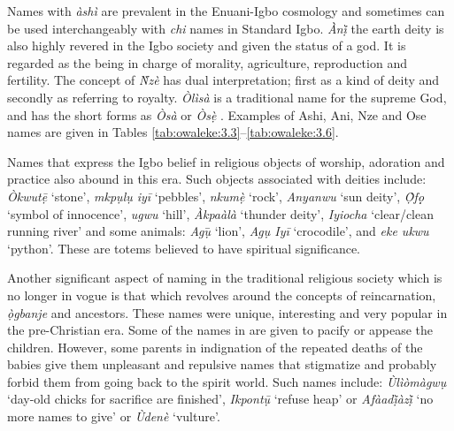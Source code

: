 \documentclass[output=paper]{langscibook}
\begin{document}
\begin{table}[p]
\caption{\label{tab:owaleke:3.6}\textit{Ǹzè} names}
\end{table}

Names with \textit{àshì} are prevalent in the Enuani-Igbo cosmology and sometimes can be used interchangeably with \textit{chi} names in Standard Igbo. \textit{Ànị̀} the earth deity is also highly revered in the Igbo society and given the status of a god. It is regarded as the being in charge of morality, agriculture, reproduction and fertility. The concept of \textit{Ǹzè} has dual interpretation; first as a kind of deity and secondly as referring to royalty. \textit{Òlìsà} is a traditional name for the supreme God, and has the short forms as \textit{Òsà} or \textit{Òsẹ̀ }. Examples of Ashi, Ani, Nze and Ose names are given in Tables \ref{tab:owaleke:3.3}–\ref{tab:owaleke:3.6}.


Names that express the Igbo belief in religious objects of worship, adoration and practice also abound in this era. Such objects associated with deities include: \\\textit{Òkwutẹ̄} ‘stone', \textit{mkpụlụ iyī} ‘pebbles’,  \textit{nkumẹ̀} ‘rock’, \textit{Anyanwu} ‘sun deity’, \textit{Ọ̀fọ̣} ‘symbol of innocence', \textit{ugwu} ‘hill’,  \textit{Àkpaàlà} ‘thunder deity’, \textit{Iyiocha} ‘clear/clean running river’ and some animals:  \textit{Agụ}̄ ‘lion’, \textit{Agụ Iyī} ‘crocodile', and \textit{eke ukwu} ‘python’. These are totems believed to have spiritual significance.\largerpage

Another significant aspect of naming in the traditional religious society which is no longer in vogue is that which revolves around the concepts of reincarnation, \textit{ọ̀gbanje } and ancestors.  These names were unique, interesting and very popular in the pre-Christian era. Some of the names in  are given to pacify or appease the children. However, some parents in indignation of the repeated deaths of the babies give them unpleasant and repulsive names that stigmatize and probably forbid them from going back to the spirit world. Such names include: \textit{Ùlìòmàgwụ} ‘day-old chicks for sacrifice are finished’, \textit{Ikpontụ̄} ‘refuse heap’ or \textit{Afàadị̀àzị̀ } ‘no more names to give’ or \textit{Ùdenè }‘vulture’.
\end{document}
